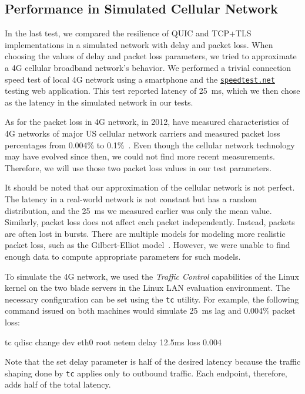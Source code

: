 \subsection{Performance in Simulated Cellular Network}

In the last test, we compared the resilience of QUIC and TCP+TLS implementations in a simulated
network with delay and packet loss. When choosing the values of delay and packet loss parameters, we
tried to approximate a 4G cellular broadband network's behavior. We performed a trivial connection
speed test of local 4G network using a smartphone and the
\href{https://speedtest.net}{\texttt{speedtest.net}} testing web application. This test reported
latency of \SI{25}{\milli\second}, which we then chose as the latency in the simulated network in
our tests.

As for the packet loss in 4G network, in 2012, \citeauthor{measuring4G} have measured
characteristics of 4G networks of major US cellular network carriers and measured packet loss
percentages from 0.004\% to 0.1\%~\cite{measuring4G}. Even though the cellular network technology
may have evolved since then, we could not find more recent measurements. Therefore, we will use
those two packet loss values in our test parameters.

It should be noted that our approximation of the cellular network is not perfect. The latency in a
real-world network is not constant but has a random distribution, and the \SI{25}{\milli\second} we
measured earlier was only the mean value. Similarly, packet loss does not affect each packet
independently. Instead, packets are often lost in bursts. There are multiple models for modeling
more realistic packet loss, such as the Gilbert-Elliot model~\cite{wiki:burst-error}. However, we
were unable to find enough data to compute appropriate parameters for such models.

To simulate the 4G network, we used the \textit{Traffic Control} capabilities of the Linux kernel on
the two blade servers in the Linux LAN evaluation environment. The necessary configuration can be
set using the \texttt{tc} utility. For example, the following command issued on both machines would
simulate \SI{25}{\milli\second} lag and 0.004\% packet loss:

\begin{myVerbatim}
tc qdisc change dev eth0 root netem delay 12.5ms loss 0.004%
\end{myVerbatim}

Note that the set delay parameter is half of the desired latency because the traffic shaping done by
\texttt{tc} applies only to outbound traffic. Each endpoint, therefore, adds half of the total
latency.

